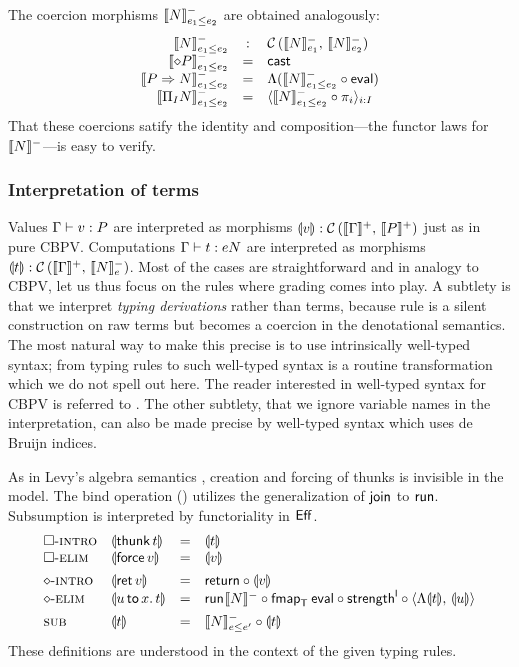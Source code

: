 \documentclass[acmsmall,review,anonymous]{acmart}\settopmatter{printfolios=true,printccs=false,printacmref=false}
\newcommand{\graybox}[1]{\grayboxtext{$#1$}}
\begin{document}
The coercion morphisms $\Denn N {e_1 \leq e_2}$ are obtained
analogously:
\[
\begin{array}{rcl}
  \Denn N {e_1 \leq e_2} & : & \Hom {\Denn N {e_1}} {\Denn N {e_2}} \\
  \Denn {\diamond P} {e_1 \leq e_2} & = & \tcast \\
  \Denn {P \To N}   {e_1 \leq e_2} & = &
    \Lambda(\Denn N {e_1 \leq e_2} \comp \teval) \\
  \Denn {\rect I N} {e_1 \leq e_2} & = &
    \langle \Denn N {e_1 \leq e_2} \comp \pi_i {} \rangle_{i:I} \\
\end{array}
\]
That these coercions satify the identity and composition---the functor
laws for $\denn N$---is easy to verify.

\subsubsection{Interpretation of terms}

Values $\ValTy \Gamma v P$ are interpreted as morphisms $\dent v :
\Hom {\denp \Gamma} {\denp P}$ just as in pure CBPV.  Computations
$\CompTy \Gamma t e N$ are interpreted as morphisms $\dent t : \Hom
{\denp \Gamma} {\Denn N e}$.  Most of the cases are straightforward
and in analogy to CBPV, let us thus focus on the
\graybox{\mbox{modified}} rules where grading comes into play.  A
subtlety is that we interpret \emph{typing derivations} rather than terms,
because rule \rsub is a silent construction on raw terms but becomes a
coercion in the denotational semantics.  The most natural way to make
this precise is to use intrinsically well-typed syntax; from typing
rules to such well-typed syntax is a routine transformation which we
do not spell out here.  The reader interested in well-typed syntax for
CBPV is referred to \citet{abelSattler:ppdp19}.
The other subtlety, that we ignore variable names in the
interpretation, can also be made precise by well-typed syntax which
uses de Bruijn indices.

As in Levy's algebra semantics \citeyearpar{levy:hosc06}, creation and
forcing of thunks is invisible in the model.  The bind operation
(\relim\diamond) utilizes the generalization of $\tjoin$ to $\trun$.
Subsumption is interpreted by functoriality in $\Eff$.
\[
\begin{array}{llcl}
\rintro\Box & \dent{\thunk t} & = & \dent t \\
\relim\Box  & \dent{\force v} & = & \dent v
\\[1ex]
\rintro\diamond & \dent{\ret v} & = & \treturn \comp \dent v \\
\relim\diamond  & \dent{\bind x u t} & = &
  \run{\denn N} \comp \fmap[\T]\teval \comp \strengthl \comp
  \langle \Lambda\dent t,\,\dent u \rangle
\\[1ex]
\rsub & \dent t & = & \Denn N {e \leq e'} \comp \dent t
\\
\end{array}
\]
These definitions are understood in the context of the given typing rules.
\end{document}

